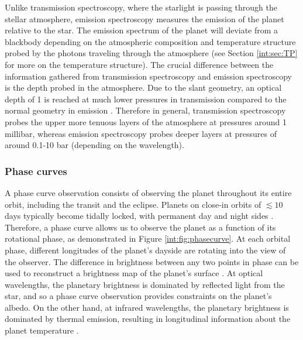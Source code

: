 Unlike transmission spectroscopy, where the starlight is passing through the stellar atmosphere, emission spectroscopy measures the emission of the planet relative to the star. The emission spectrum of the planet will deviate from a blackbody depending on the atmospheric composition and temperature structure probed by the photons traveling through the atmosphere (see Section \ref{int:sec:TP} for more on the temperature structure). The crucial difference between the information gathered from transmission spectroscopy and emission spectroscopy is the depth probed in the atmosphere. Due to the slant geometry, an optical depth of 1 is reached at much lower pressures in transmission compared to the normal geometry in emission \citep{Fortney2005}. Therefore in general, transmission spectroscopy probes the upper more tenuous layers of the atmosphere at pressures around 1 millibar, whereas emission spectroscopy probes deeper layers at pressures of around 0.1-10 bar (depending on the wavelength).

\subsubsection{Phase curves}

A phase curve observation consists of observing the planet throughout its entire orbit, including the transit and the eclipse. Planets on close-in orbits of $\lesssim10$ days typically become tidally locked, with permanent day and night sides \citep[e.g.,][]{Guillot1996}. Therefore, a phase curve allows us to observe the planet as a function of its rotational phase, as demonstrated in Figure \ref{int:fig:phasecurve}. At each orbital phase, different longitudes of the planet's dayside are rotating into the view of the observer. The difference in brightness between any two points in phase can be used to reconstruct a brightness map of the planet's surface \citep{Knutson2007, Knutson2012, Crossfield2012, Borucki2009, Snellen2009}. At optical wavelengths, the planetary brightness is dominated by reflected light from the star, and so a phase curve observation provides constraints on the planet's albedo. On the other hand, at infrared wavelengths, the planetary brightness is dominated by thermal emission, resulting in longitudinal information about the planet temperature \citep{Parmentier2018b}.

